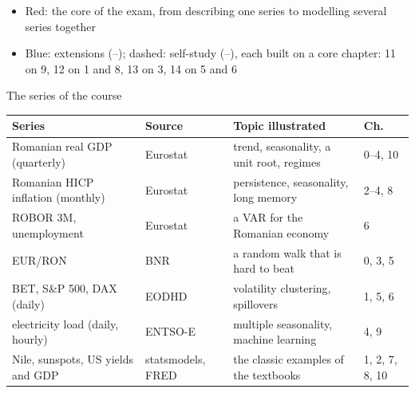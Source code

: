 \begin{frame}
\begin{center}
{}
\end{center}
\vspace{-0.2cm}
\begin{itemize}
    \item Red: the core of the exam, from describing one series to modelling several series together
    \item Blue: extensions (--); dashed: self-study (--), each built on a core chapter: 11 on 9, 12 on 1 and 8, 13 on 3, 14 on 5 and 6
\end{itemize}
\end{frame}

\begin{frame}{The series of the course}
\itemsize{\small}
\begin{center}
\footnotesize
\begin{tabular}{>{\raggedright\arraybackslash}p{3.6cm}>{\raggedright\arraybackslash}p{2.6cm}>{\raggedright\arraybackslash}p{4.2cm}l}
\toprule
\textbf{Series} & \textbf{Source} & \textbf{Topic illustrated} & \textbf{Ch.} \\
\midrule
Romanian real GDP (quarterly) & Eurostat & trend, seasonality, a unit root, regimes & 0--4, 10 \\
Romanian HICP inflation (monthly) & Eurostat & persistence, seasonality, long memory & 2--4, 8 \\
ROBOR 3M, unemployment & Eurostat & a VAR for the Romanian economy & 6 \\
EUR/RON & BNR & a random walk that is hard to beat & 0, 3, 5 \\
BET, S\&P 500, DAX (daily) & EODHD & volatility clustering, spillovers & 1, 5, 6 \\
electricity load (daily, hourly) & ENTSO-E & multiple seasonality, machine learning & 4, 9 \\
Nile, sunspots, US yields and GDP & statsmodels, FRED & the classic examples of the textbooks & 1, 2, 7, 8, 10 \\
\bottomrule
\end{tabular}
\end{center}
\end{frame}


